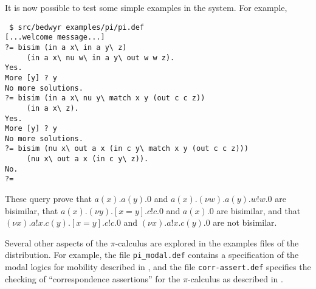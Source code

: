 It is now possible to test some simple examples in the system.  For
example,
\begin{verbatim}
 $ src/bedwyr examples/pi/pi.def
[...welcome message...]
?= bisim (in a x\ in a y\ z)
     (in a x\ nu w\ in a y\ out w w z).
Yes.
More [y] ? y
No more solutions.
?= bisim (in a x\ nu y\ match x y (out c c z))
     (in a x\ z).
Yes.
More [y] ? y
No more solutions.
?= bisim (nu x\ out a x (in c y\ match x y (out c c z)))
     (nu x\ out a x (in c y\ z)).
No.
?=
\end{verbatim}
These query prove that
$a(x).a(y).0$ and $a(x).(\nu w).a(y).w!w.0$ are bisimilar,
that
$a(x).(\nu y).[x=y].c!c.0$ and $a(x).0$ are bisimilar, and that
$(\nu x).a!x.c(y).[x=y].c!c.0$ and
$(\nu x).a!x.c(y).0$ are not bisimilar.

Several other aspects of the $\pi$-calculus are explored in the examples
files of the distribution.  For example, the file \verb+pi_modal.def+
contains a specification of the modal logics for mobility described in
\cite{milner93tcs}, and the file \verb+corr-assert.def+ specifies the
checking of ``correspondence assertions'' for the $\pi$-calculus as
described in \cite{gordon03tcs}.
